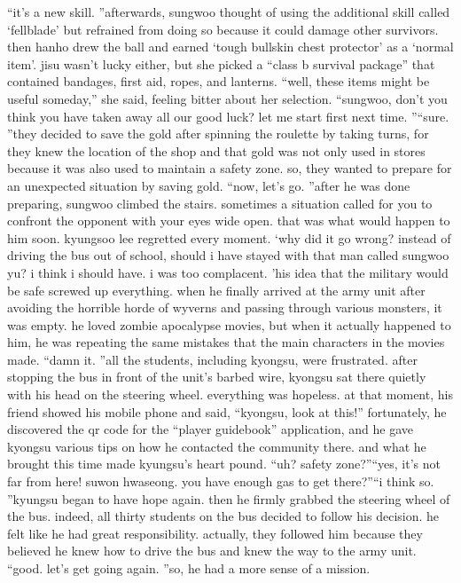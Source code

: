 “it’s a new skill.
”afterwards, sungwoo thought of using the additional skill called ‘fellblade’ but refrained from doing so because it could damage other survivors.
then hanho drew the ball and earned ‘tough bullskin chest protector’ as a ‘normal item’.
jisu wasn’t lucky either, but she picked a “class b survival package” that contained bandages, first aid, ropes, and lanterns.
“well, these items might be useful someday,” she said, feeling bitter about her selection.
“sungwoo, don’t you think you have taken away all our good luck? let me start first next time.
”“sure.
”they decided to save the gold after spinning the roulette by taking turns, for they knew the location of the shop and that gold was not only used in stores because it was also used to maintain a safety zone.
 so, they wanted to prepare for an unexpected situation by saving gold.
“now, let’s go.
”after he was done preparing, sungwoo climbed the stairs.
sometimes a situation called for you to confront the opponent with your eyes wide open.
 that was what would happen to him soon.
kyungsoo lee regretted every moment.
‘why did it go wrong? instead of driving the bus out of school, should i have stayed with that man called sungwoo yu? i think i should have.
 i was too complacent.
’his idea that the military would be safe screwed up everything.
 when he finally arrived at the army unit after avoiding the horrible horde of wyverns and passing through various monsters, it was empty.
 he loved zombie apocalypse movies, but when it actually happened to him, he was repeating the same mistakes that the main characters in the movies made.
“damn it.
”all the students, including kyongsu, were frustrated.
 after stopping the bus in front of the unit’s barbed wire, kyongsu sat there quietly with his head on the steering wheel.
 everything was hopeless.
at that moment, his friend showed his mobile phone and said, “kyongsu, look at this!”
fortunately, he discovered the qr code for the “player guidebook” application, and he gave kyongsu various tips on how he contacted the community there.
 and what he brought this time made kyungsu’s heart pound.
“uh? safety zone?”“yes, it’s not far from here! suwon hwaseong.
 you have enough gas to get there?”“i think so.
”kyungsu began to have hope again.
 then he firmly grabbed the steering wheel of the bus.
indeed, all thirty students on the bus decided to follow his decision.
 he felt like he had great responsibility.
 actually, they followed him because they believed he knew how to drive the bus and knew the way to the army unit.
“good.
 let’s get going again.
”so, he had a more sense of a mission.
